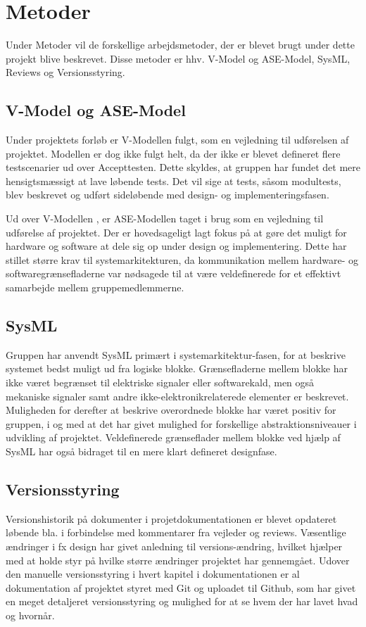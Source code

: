 \section{Metoder} \label{ch:Metoder}

Under Metoder vil de forskellige arbejdsmetoder, der er blevet brugt under dette projekt blive beskrevet. 
Disse metoder er hhv. V-Model og ASE-Model, SysML, Reviews og Versionsstyring.

\subsection{V-Model og ASE-Model} 
Under projektets forløb er V-Modellen\cite{lib:T-006} fulgt, som en vejledning til udførelsen af projektet. 
Modellen er dog ikke fulgt helt, da der ikke er blevet defineret flere testscenarier ud over Accepttesten. 
Dette skyldes, at gruppen har fundet det mere hensigtsmæssigt at lave løbende tests.
Det vil sige at tests, såsom modultests, blev beskrevet og udført sideløbende med design- og implementeringsfasen.

Ud over V-Modellen , er ASE-Modellen \cite{lib:vejledning} taget i brug som en vejledning til udførelse af projektet. 
Der er hovedsageligt lagt fokus på at gøre det muligt for hardware og software at dele sig op under design og implementering. 
Dette har stillet større krav til systemarkitekturen, da kommunikation mellem hardware- og softwaregrænsefladerne var nødsagede til at være veldefinerede for et effektivt samarbejde mellem gruppemedlemmerne.

\subsection{SysML}
Gruppen har anvendt SysML primært i systemarkitektur-fasen, for at beskrive systemet bedst muligt ud fra logiske blokke.
Grænsefladerne mellem blokke har ikke været begrænset til elektriske signaler eller softwarekald, men også mekaniske signaler samt andre ikke-elektronikrelaterede elementer er beskrevet. 
Muligheden for derefter at beskrive overordnede blokke har været positiv for gruppen, i og med at det har givet mulighed for forskellige abstraktionsniveauer i udvikling af projektet.
Veldefinerede grænseflader mellem blokke ved hjælp af SysML har også bidraget til en mere klart defineret designfase.

\subsection{Versionsstyring}
Versionshistorik på dokumenter i projetdokumentationen er blevet opdateret løbende bla. i forbindelse med kommentarer fra vejleder og reviews. 
Væsentlige ændringer i fx design har givet anledning til versions-ændring, hvilket hjælper med at holde styr på hvilke større ændringer projektet har gennemgået.
Udover den manuelle versionsstyring i hvert kapitel i dokumentationen er al dokumentation af projektet styret med Git og uploadet til Github\cite{lib:au2_git}, som har givet en meget detaljeret versionsstyring og mulighed for at se hvem der har lavet hvad og hvornår.

